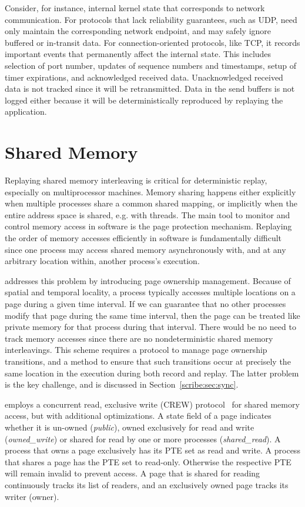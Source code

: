 Consider, for instance, internal kernel state that corresponds to
network communication. For protocols that lack reliability guarantees,
such as UDP, \scribe{} need only maintain the corresponding network
endpoint, and may safely ignore buffered or
in-transit data. For connection-oriented protocols, like TCP, it
records important events that permanently affect the internal
state. This includes selection of port number, updates of sequence
numbers and timestamps, setup of timer expirations, and acknowledged
received data. Unacknowledged received data is not tracked since it
will be retransmitted. Data in the send buffers is not logged either
because it will be deterministically reproduced by replaying the
application.

  
\section{Shared Memory}
\label{scribe:sec:memory}

Replaying shared memory interleaving is critical for deterministic
replay, especially on multiprocessor machines.  Memory sharing happens
either explicitly when multiple processes share a common shared
mapping, or implicitly when the entire address space is shared,
e.g. with threads.  The main tool to monitor and control memory
access in software is the page protection mechanism.  Replaying the
order of memory accesses efficiently in software is fundamentally
difficult since one process may access shared memory asynchronously
with, and at any arbitrary location within, another process's
execution.

   

\scribe{} addresses this problem by introducing page ownership
management. Because of spatial and temporal locality, a process
typically accesses multiple locations on a page during a given time
interval.  If we can guarantee that no other processes modify that
page during the same time interval, then the page can be treated like
private memory for that process during that interval.  There would be
no need to track memory accesses since there are no nondeterministic
shared memory interleavings. This scheme requires a
protocol to manage page ownership transitions, and a method to ensure
that such transitions occur at precisely the same location in the
execution during both record and replay. The latter problem is the
key challenge, and is discussed in Section~\ref{scribe:sec:sync}.

\scribe{} employs a concurrent read, exclusive write (CREW)
protocol~\cite{crew,instant-replay} for shared memory access, but with
additional optimizations.  A state
field of a page indicates whether it is un-owned ({\em public}), owned
exclusively for read and write ({\em owned\_write}) or shared for read
by one or more processes ({\em shared\_read}). A process that owns
a page exclusively has its PTE set as read and write. A process that
shares a page has the PTE set to read-only. Otherwise the respective
PTE will remain invalid to prevent access. A page that is shared for
reading continuously tracks its list of readers, and an exclusively
owned page tracks its writer (owner).

